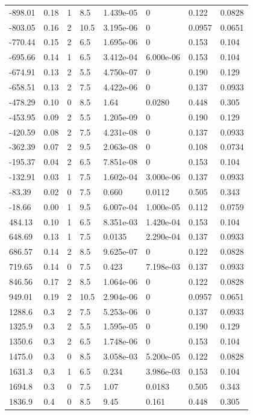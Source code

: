 \documentclass[preview]{standalone}
\begin{document}
{{\begin{tabular}{L{1.2cm}C{1.2cm} C{0.3cm}C{0.5cm} C{1.4cm}C{1.4cm} C{1.4cm}C{1.4cm}}
  -898.01  &  0.18  & 1     & 8.5 &  1.439e-05  & 0  & 0.122 &  0.0828   \\ 
  -803.05  &  0.16  & 2     & 10.5 &  3.195e-06  & 0  & 0.0957 &  0.0651   \\ 
  -770.44  &  0.15  & 2     & 6.5 &  1.695e-06  & 0  & 0.153 &  0.104   \\ 
  -695.66  &  0.14  & 1     & 6.5 &  3.412e-04  & 6.000e-06  & 0.153 &  0.104   \\ 
  -674.91  &  0.13  & 2     & 5.5 &  4.750e-07  & 0  & 0.190 &  0.129   \\ 
  -658.51  &  0.13  & 2     & 7.5 &  4.422e-06  & 0  & 0.137 &  0.0933   \\ 
  -478.29  &  0.10  & 0     & 8.5 &  1.64  & 0.0280  & 0.448 &  0.305   \\ 
  -453.95  &  0.09  & 2     & 5.5 &  1.205e-09  & 0  & 0.190 &  0.129   \\ 
  -420.59  &  0.08  & 2     & 7.5 &  4.231e-08  & 0  & 0.137 &  0.0933   \\ 
  -362.39  &  0.07  & 2     & 9.5 &  2.063e-08  & 0  & 0.108 &  0.0734   \\ 
  -195.37  &  0.04  & 2     & 6.5 &  7.851e-08  & 0  & 0.153 &  0.104   \\ 
  -132.91  &  0.03  & 1     & 7.5 &  1.602e-04  & 3.000e-06  & 0.137 &  0.0933   \\ 
  -83.39  &  0.02  & 0     & 7.5 &  0.660  & 0.0112  & 0.505 &  0.343   \\ 
  -18.66  &  0.00  & 1     & 9.5 &  6.007e-04  & 1.000e-05  & 0.112 &  0.0759   \\ 
  484.13  &  0.10  & 1     & 6.5 &  8.351e-03  & 1.420e-04  & 0.153 &  0.104   \\ 
  648.69  &  0.13  & 1     & 7.5 &  0.0135  & 2.290e-04  & 0.137 &  0.0933   \\ 
  686.57  &  0.14  & 2     & 8.5 &  9.625e-07  & 0  & 0.122 &  0.0828   \\ 
  719.65  &  0.14  & 0     & 7.5 &  0.423  & 7.198e-03  & 0.137 &  0.0933   \\ 
  846.56  &  0.17  & 2     & 8.5 &  1.064e-06  & 0  & 0.122 &  0.0828   \\ 
  949.01  &  0.19  & 2     & 10.5 &  2.904e-06  & 0  & 0.0957 &  0.0651   \\ 
  1288.6  &   0.3  & 2     & 7.5 &  5.253e-06  & 0  & 0.137 &  0.0933   \\ 
  1325.9  &   0.3  & 2     & 5.5 &  1.595e-05  & 0  & 0.190 &  0.129   \\ 
  1350.6  &   0.3  & 2     & 6.5 &  1.748e-06  & 0  & 0.153 &  0.104   \\ 
  1475.0  &   0.3  & 0     & 8.5 &  3.058e-03  & 5.200e-05  & 0.122 &  0.0828   \\ 
  1631.3  &   0.3  & 1     & 6.5 &  0.234  & 3.986e-03  & 0.153 &  0.104   \\ 
  1694.8  &   0.3  & 0     & 7.5 &  1.07  & 0.0183  & 0.505 &  0.343   \\ 
  1836.9  &   0.4  & 0     & 8.5 &  9.45  & 0.161  & 0.448 &  0.305   \\ 
\hline 
\end{tabular} 

}}
\end{document}
